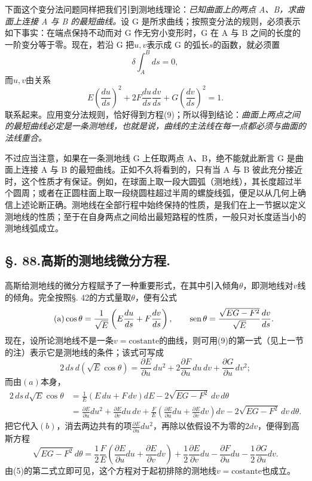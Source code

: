 下面这个变分法问题同样把我们引到测地线理论：\emph{已知曲面上的两点 A、B，求曲面上连接 A 与 B 的最短曲线。}设 G 是所求曲线；按照变分法的规则，必须表示如下事实：在端点保持不动而对 G 作无穷小变形时，G 在 A 与 B 之间的长度的一阶变分等于零。现在，若沿 G 把\(u,v\)表示成 G 的弧长\(s\)的函数，就必须置
\[
 \delta\int_A^B ds=0,
\]
而\(u,v\)由关系
\[
 E\left(\frac{du}{ds}\right)^2+2F\frac{du}{ds}\frac{dv}{ds}+G\left(\frac{dv}{ds}\right)^2=1.
\]
联系起来。应用变分法规则，恰好得到方程(9)；所以得到结论：\emph{曲面上两点之间的最短曲线必定是一条测地线，也就是说，曲线的主法线在每一点都必须与曲面的法线重合。}

不过应当注意，如果在一条测地线 G 上任取两点 A、B，绝不能就此断言 G 是曲面上连接 A 与 B 的最短曲线。正如不久将看到的，只有当 A 与 B 彼此充分接近时，这个性质才有保证。例如，在球面上取一段大圆弧（测地线），其长度超过半个圆周；或者在正圆柱面上取一段绕圆柱超过半周的螺旋线弧，便足以从几何上确信上述论断正确。测地线在全部行程中始终保持的性质，是我们在上一节据以定义测地线的性质；至于在自身两点之间给出最短路程的性质，一般只对长度适当小的测地线弧成立。

\subsection*{\S. 88.\quad 高斯的测地线微分方程.}

高斯给测地线的微分方程赋予了一种重要形式，在其中引入倾角\(\theta\)，即测地线对\(v\)线的倾角。完全按照\S. 42的方式量取\(\theta\)，便有公式
\begin{equation}\tag{a}
 \cos\theta=\frac1{\sqrt E}\left(E\frac{du}{ds}+F\frac{dv}{ds}\right),
 \qquad
 \operatorname{sen}\theta=\frac{\sqrt{EG-F^2}}{\sqrt E}\frac{dv}{ds}.
\end{equation}
现在，设所论测地线不是一条\(v=\mathrm{costante}\)的曲线，则可用(9)的第一式（见上一节的注）表示它是测地线的条件；该式可写成
\begin{equation}\tag{b}
 2\,ds\,d(\sqrt E\cos\theta)=\frac{\partial E}{\partial u}\,du^2+2\frac{\partial F}{\partial u}\,du\,dv+\frac{\partial G}{\partial u}\,dv^2;
\end{equation}
而由\((a)\)本身，
\[
\begin{aligned}
2\,ds\,d\sqrt E\cos\theta
&=\frac1E(E\,du+F\,dv)dE-2\sqrt{EG-F^2}\,dv\,d\theta\\
&=\frac{\partial E}{\partial u}du^2+\frac{\partial E}{\partial v}du\,dv
+\frac FE\left(\frac{\partial E}{\partial u}du+\frac{\partial E}{\partial v}dv\right)dv
-2\sqrt{EG-F^2}\,dv\,d\theta.
\end{aligned}
\]
把它代入\((b)\)，消去两边共有的项\(\frac{\partial E}{\partial u}du^2\)，再除以依假设不为零的\(2dv\)，便得到高斯方程
\begin{equation}\tag{11}
 \sqrt{EG-F^2}\,d\theta=\frac12\frac FE\left(\frac{\partial E}{\partial u}du+\frac{\partial E}{\partial v}dv\right)+\frac12\frac{\partial E}{\partial v}du-\frac{\partial F}{\partial u}du-\frac12\frac{\partial G}{\partial u}dv.
\end{equation}
由(5)的第二式立即可见，这个方程对于起初排除的测地线\(v=\mathrm{costante}\)也成立。

